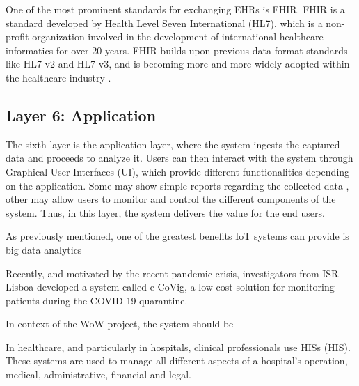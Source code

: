 One of the most prominent standards for exchanging \acs{EHR}s is \acf{FHIR}. \acs{FHIR} is a standard developed by Health Level Seven International (HL7), which is a non-profit organization involved in the development of international healthcare informatics for over 20 years. \acs{FHIR} builds upon previous data format standards like HL7 v2 and HL7 v3, and is becoming more and more widely adopted within the healthcare industry \cite{Peng2019}. 

\subsection{Layer 6: Application}
\label{sec:iot-model-layer6}



The sixth layer is the application layer, where the system ingests the captured data and proceeds to analyze it. Users can then interact with the system through Graphical User Interfaces (UI), which provide different functionalities depending on the application. Some may show simple reports regarding the collected data \cite{Doukas2012, Wu2020}, other may allow users to monitor and control the different components of the system. Thus, in this layer, the system delivers the value for the end users.

As previously mentioned, one of the greatest benefits \acs{IoT} systems can provide is big data analytics 

Recently, and motivated by the recent pandemic crisis, investigators from ISR-Lisboa developed a system called e-CoVig, a low-cost solution for monitoring patients during the COVID-19 quarantine.  

In context of the \acs{WoW} project, the system should be 


In healthcare, and particularly in hospitals, clinical professionals use \acl{HIS}s (\acs{HIS}). These systems are used to manage all different aspects of a hospital's operation, medical, administrative, financial and legal. 




